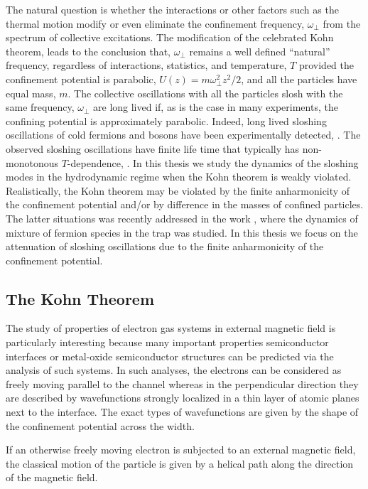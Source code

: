 The natural question is whether the interactions or other factors such as the thermal motion modify or even eliminate the confinement frequency, $\omega_{\perp}$
from the spectrum of collective excitations.
The modification of the celebrated Kohn theorem, \cite{Brey1989, Dobson1994, Iqbal} leads to the conclusion that, $\omega_{\perp}$ remains a well defined ``natural'' frequency, regardless of interactions, statistics, and temperature, $T$ provided the confinement potential is parabolic,  $U(z) = m \omega_{\perp}^2 z^2/2$, and all the particles have equal mass, $m$.
The collective oscillations with all the particles slosh with the same frequency, $\omega_{\perp}$ are long lived if, as is the case in many experiments, the confining potential is approximately parabolic. 
Indeed, long lived sloshing oscillations of cold fermions and bosons have been experimentally detected, \cite{inouye1998, dalfovo1999, strecker2003, bourdel2004, Altmeyer, giorgini2008, Pantel2012}.
The observed sloshing oscillations have finite life time that typically has non-monotonous $T$-dependence, \cite{dalfovo1999, giorgini2008}. 
In this thesis we study the dynamics of the sloshing modes in the hydrodynamic regime when the Kohn theorem is weakly violated.
Realistically, the Kohn theorem may be violated by the finite anharmonicity of the confinement potential and/or by difference in the masses of confined particles.
The latter situations was recently addressed in the work \cite{bamler2015}, where the dynamics of mixture of fermion species in the trap was studied.
In this thesis we focus on the attenuation of sloshing oscillations due to the finite anharmonicity of the confinement potential.


\subsection{The Kohn Theorem}
The study of properties of electron gas systems in external magnetic field is particularly interesting because many important properties semiconductor interfaces or metal-oxide semiconductor structures can be predicted via the analysis of such systems. In such analyses, the electrons can be considered as freely moving parallel to the channel whereas in the perpendicular direction they are described by wavefunctions strongly localized in a thin layer of atomic planes next to the interface. The exact types of wavefunctions are given by the shape of the confinement potential across the width\cite{Grosso}.

If an otherwise freely moving electron is subjected to an external magnetic field, the classical motion of the particle is given by a helical path along the direction of the magnetic field. 

